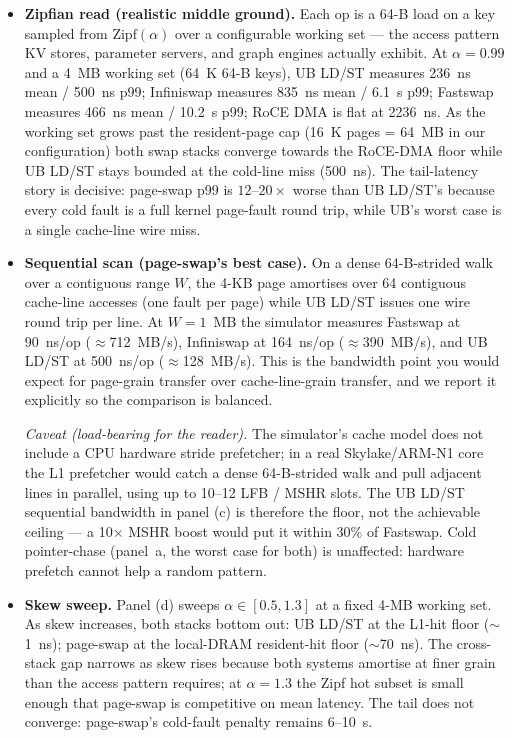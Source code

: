 \documentclass[10pt,twocolumn]{article}
\begin{document}
\begin{itemize}\itemsep -1pt
\item \textbf{Zipfian read (realistic middle ground).} Each op is a
  64-B load on a key sampled from $\text{Zipf}(\alpha)$ over a
  configurable working set --- the access pattern KV stores,
  parameter servers, and graph engines actually exhibit. At
  $\alpha{=}0.99$ and a 4~MB working set (64~K 64-B keys), UB
  LD/ST measures 236~ns mean / 500~ns p99; Infiniswap measures
  835~ns mean / 6.1~\textmu s p99; Fastswap measures 466~ns mean /
  10.2~\textmu s p99; RoCE DMA is flat at 2236~ns. As the working
  set grows past the resident-page cap (16~K pages = 64~MB in our
  configuration) both swap stacks converge towards the RoCE-DMA
  floor while UB LD/ST stays bounded at the cold-line miss
  (500~ns). The tail-latency story is decisive: page-swap p99 is
  $12\textrm{--}20\times$ worse than UB LD/ST's because every cold
  fault is a full kernel page-fault round trip, while UB's worst
  case is a single cache-line wire miss.
\item \textbf{Sequential scan (page-swap's best case).} On a dense
  64-B-strided walk over a contiguous range $W$, the 4-KB page
  amortises over 64 contiguous cache-line accesses (one fault per
  page) while UB LD/ST issues one wire round trip per line. At
  $W{=}1$~MB the simulator measures Fastswap at 90~ns/op
  ($\approx$712~MB/s), Infiniswap at 164~ns/op ($\approx$390~MB/s),
  and UB LD/ST at 500~ns/op ($\approx$128~MB/s). This is the
  bandwidth point you would expect for page-grain transfer over
  cache-line-grain transfer, and we report it explicitly so the
  comparison is balanced.

  \emph{Caveat (load-bearing for the reader).} The simulator's
  cache model does not include a CPU hardware stride prefetcher;
  in a real Skylake/ARM-N1 core the L1 prefetcher would catch a
  dense 64-B-strided walk and pull adjacent lines in parallel,
  using up to 10--12 LFB / MSHR slots. The UB LD/ST sequential
  bandwidth in panel (c) is therefore the floor, not the
  achievable ceiling --- a 10$\times$ MSHR boost would
  put it within 30\% of Fastswap. Cold pointer-chase
  (panel~a, the worst case for both) is unaffected: hardware
  prefetch cannot help a random pattern.
\item \textbf{Skew sweep.} Panel (d) sweeps $\alpha\in[0.5,1.3]$ at a
  fixed 4-MB working set. As skew increases, both stacks bottom
  out: UB LD/ST at the L1-hit floor ($\sim$1~ns); page-swap at the
  local-DRAM resident-hit floor ($\sim$70~ns). The cross-stack gap
  narrows as skew rises because both systems amortise at finer
  grain than the access pattern requires; at $\alpha{=}1.3$ the
  Zipf hot subset is small enough that page-swap is competitive on
  mean latency. The tail does not converge: page-swap's
  cold-fault penalty remains 6--10~\textmu s.
\end{itemize}
\end{document}
